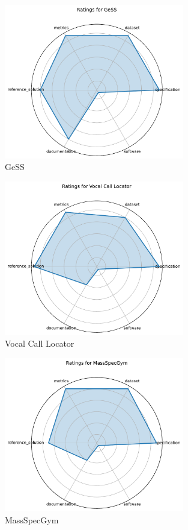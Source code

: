 \documentclass{article}
\begin{document}
\begin{figure}[h!]
  \centering
  \includegraphics[width=0.7\textwidth]{GeSS_radar.pdf}
  \caption{GeSS}
\end{figure}

\begin{figure}[h!]
  \centering
  \includegraphics[width=0.7\textwidth]{Vocal Call Locator_radar.pdf}
  \caption{Vocal Call Locator}
\end{figure}

\begin{figure}[h!]
  \centering
  \includegraphics[width=0.7\textwidth]{MassSpecGym_radar.pdf}
  \caption{MassSpecGym}
\end{figure}
\end{document}
